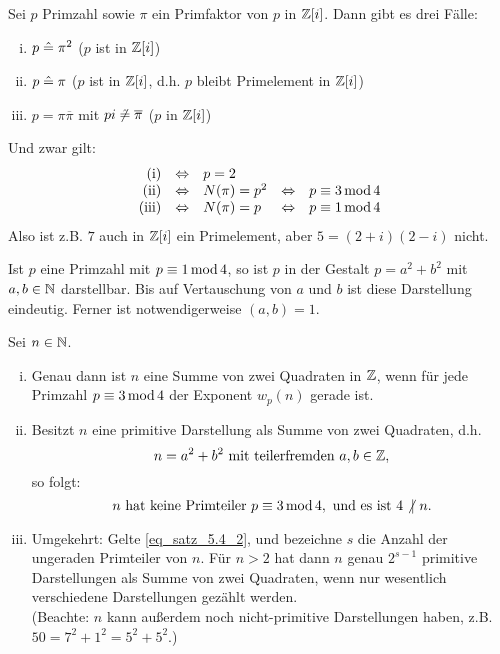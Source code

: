 \begin{satz} \label{satz_5.3}
	Sei $p$ Primzahl sowie $\pi$ ein Primfaktor von $p$ in $\mathbb{Z}[i]$. Dann gibt es drei Fälle: \begin{enumerate}[(i)]
		\item $p \mathrel{\hat=} \pi^2$ \quad ($p$ ist  in $\mathbb{Z}[i]$)
		\item $p \mathrel{\hat=} \pi$ \quad ($p$ ist  in $\mathbb{Z}[i]$, d.h. $p$ bleibt Primelement in $\mathbb{Z}[i]$)
		\item $p = \pi \overline{\pi}$ mit $pi \not \mathrel{\hat=} \overline{\pi}$ \quad ($p$  in $\mathbb{Z}[i]$)
	\end{enumerate}
	Und zwar gilt:  
	\[\begin{array}{rclcl}
		\text{(i)} & \Leftrightarrow &  p = 2 &  & \\ 
		\text{(ii)} & \Leftrightarrow  & N(\pi) = p^2 & \Leftrightarrow &  p \equiv 3 \operatorname{mod} 4 \\ 
		\text{(iii)} & \Leftrightarrow & N(\pi) = p & \Leftrightarrow &  p \equiv 1 \operatorname{mod} 4 \\ 
	\end{array}\]
	Also ist z.B. $7$ auch in $\mathbb{Z}[i]$ ein Primelement, aber $5 = (2+i)(2-i)$ nicht.	
\end{satz}

	Ist $p$ eine Primzahl mit $p \equiv 1 \operatorname{mod} 4$, so ist $p$ in der Gestalt $p = a^2 + b^2$ mit $a,b \in \mathbb{N}$ darstellbar. Bis auf Vertauschung von $a$ und $b$ ist diese Darstellung eindeutig. Ferner ist notwendigerweise $(a,b) = 1$.
	
\begin{satz} \label{satz_5.4}
	Sei $n \in \mathbb{N}$. \begin{enumerate}[(i)]
		\item Genau dann ist $n$ eine Summe von zwei Quadraten in $\mathbb{Z}$, wenn für jede Primzahl $p \equiv 3 \operatorname{mod} 4$ der Exponent $w_p(n)$ gerade ist.
		\item Besitzt $n$ eine primitive Darstellung als Summe von zwei Quadraten, d.h.
		\begin{equation}
			n = a^2 + b^2 \text{ mit teilerfremden } a,b \in \mathbb{Z}, \label{eq_satz_5.4_1}
		\end{equation}
		so folgt:
		\begin{equation}
			n \text{ hat keine Primteiler } p \equiv 3 \operatorname{mod} 4, \text{ und es ist } 4 \not | \ n. \label{eq_satz_5.4_2}
		\end{equation}
		\item Umgekehrt: Gelte \eqref{eq_satz_5.4_2}, und bezeichne $s$ die Anzahl der ungeraden Primteiler von $n$. Für $n > 2$ hat dann $n$ genau $2^{s-1}$ primitive Darstellungen als Summe von zwei Quadraten, wenn nur wesentlich verschiedene Darstellungen gezählt werden. \\
		(Beachte: $n$ kann außerdem noch nicht-primitive Darstellungen haben, z.B. $50 = 7^2 + 1^2 = 5^2 + 5^2$.)
	\end{enumerate}
\end{satz}